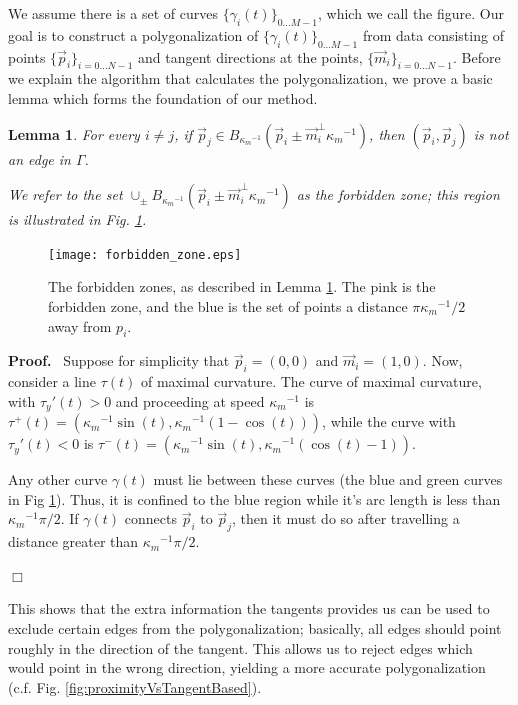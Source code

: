 \documentclass{article}
\newenvironment{proof}{
  \noindent\textbf{Proof.}\ }{\hspace*{\fill}
  \begin{math}\Box\end{math}\medskip}
\newtheorem{lemma}[cntr]{Lemma}
\numberwithin{cntr}{section}
\numberwithin{equation}{section}
\newcommand{\vp}[0]{{\vec{p}}}
\newcommand{\vm}[0]{{\vec{m}}}
\newcommand{\Oto}[1]{{0 \ldots #1-1}}
\newcommand{\OtoN}{{0 \ldots N-1}}
\newcommand{\pointData}{{ \{ \vp_{i} \}_{i=\OtoN} }}
\newcommand{\tanData}{{ \{ \vm_{i} \}_{i=\OtoN} }}
\newcommand{\curveSet}{{ \{ \gamma_i(t) \}_{\Oto{M}}}}
\newcommand{\poly}{{\Gamma}}
\newcommand{\ball}[2]{ { B_{#1}(#2) } }
\newcommand{\curvemax}{{\kappa_{m}}}
\newcommand{\curvemaxi}{{\curvemax^{-1}}}
\begin{document}
We assume there is a set of curves $\curveSet$, which we call the figure. Our goal is to construct a polygonalization of $\curveSet$ from data consisting of points $\pointData$ and tangent directions at the points, $\tanData$. Before we explain the algorithm that calculates the polygonalization, we prove a basic lemma which forms the foundation of our method.
\begin{lemma}
  \label{lem:forbiddenZone}
  For every $i \neq j$, if $\vp_{j} \in \ball{\curvemaxi}{\vp_{i} \pm \vm_{i}^{\perp} \curvemaxi}$, then $(\vp_{i},\vp_{j})$ is not an edge in $\poly$.

  We refer to the set $\cup_{\pm} \ball{\curvemaxi}{\vp_{i} \pm \vm_{i}^{\perp} \curvemaxi}$ as the \emph{forbidden zone}; this region is illustrated in Fig. \ref{fig:forbiddenZone}.
\end{lemma}
\begin{figure}
\setlength{\unitlength}{0.240900pt}
\ifx\plotpoint\undefined\newsavebox{\plotpoint}\fi
\sbox{\plotpoint}{\rule[-0.200pt]{0.400pt}{0.400pt}}%
\texttt{[image: forbidden\_zone.eps]}

\caption{The forbidden zones, as described in Lemma \ref{lem:forbiddenZone}. The pink is the forbidden zone, and the blue is the set of points a distance $\pi \curvemaxi/2$ away from $p_{i}$.}
\label{fig:forbiddenZone}
\end{figure}
\begin{proof}
  Suppose for simplicity that $\vp_{i}=(0,0)$ and $\vm_{i}=(1,0)$. Now, consider a line $\tau(t)$ of maximal curvature. The curve of maximal curvature, with $\tau_{y}'(t) > 0$ and proceeding at speed $\curvemaxi$ is $\tau^{+}(t)=(\curvemaxi \sin(t), \curvemaxi (1-\cos(t)))$, while the curve with $\tau_{y}'(t) < 0$ is $\tau^{-}(t)=(\curvemaxi \sin(t), \curvemaxi (\cos(t)-1))$.

Any other curve $\gamma(t)$ must lie between these curves (the blue and green curves in Fig \ref{lem:forbiddenZone}). Thus, it is confined to the blue region while it's arc length is less than $\curvemaxi \pi/2$. If $\gamma(t)$ connects $\vp_{i}$ to $\vp_{j}$, then it must do so after travelling a distance greater than $\curvemaxi \pi/2$.

\end{proof}

This shows that the extra information the tangents provides us can be used to exclude certain edges from the polygonalization; basically, all edges should point roughly in the direction of the tangent. This allows us to reject edges which would point in the wrong direction, yielding a more accurate polygonalization (c.f. Fig. \ref{fig:proximityVsTangentBased}).
\end{document}
